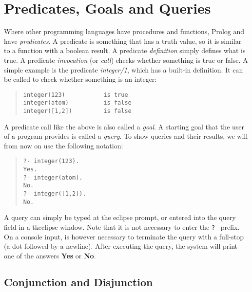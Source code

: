 \section{Predicates, Goals and Queries}

Where other programming languages have procedures and functions,
Prolog and {\eclipse} have {\em predicates}.  A predicate is something
that has a truth value, so it is similar to a function with a boolean result.
A predicate {\em definition} simply defines what is true.
A predicate {\em invocation} (or {\em call}) checks whether something is true or false.
A simple example is the predicate {\em integer/1}, which has a built-in
definition. It can be called to check whether something is an integer:
\begin{quote}\begin{verbatim}
integer(123)           is true
integer(atom)          is false
integer([1,2])         is false
\end{verbatim}\end{quote}
A predicate call like the above is also called a {\em goal}.
A starting goal that the user of a program provides is called a {\em query}.
To show queries and their results, we will from now on
use the following notation:
\begin{quote}\begin{verbatim}
?- integer(123).
Yes.
?- integer(atom).
No.
?- integer([1,2]).
No.
\end{verbatim}\end{quote}
A query can simply be typed at the eclipse prompt, or entered into the
query field in a tkeclipse window. Note that it is not necessary to enter
the {\tt ?-} prefix.
On a console input, is however necessary to terminate the query with a
full-stop (a dot followed by a newline).
After executing the query, the system will print one of the
answers {\bf Yes} or {\bf No}.


\subsection{Conjunction and Disjunction}

